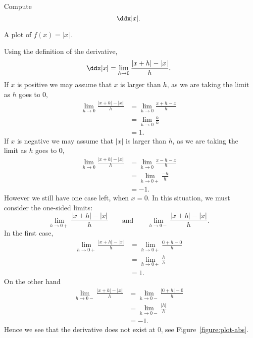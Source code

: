 \begin{example}
Compute 
\[
\ddx |x|.
\]
\end{example}
\begin{marginfigure}
\caption{A plot of $f(x) = |x|$.}
\label{figure:plot-abs}
\end{marginfigure}
\begin{solution}
Using the definition of the derivative,
\[
\ddx |x| = \lim_{h\to0}\frac{|x+h| -|x|}{h}.
\]
If $x$ is positive we may assume that $x$ is larger than $h$, as we are
taking the limit as $h$ goes to $0$,
\begin{align*}
\lim_{h\to0}\frac{|x+h| -|x|}{h} &= \lim_{h\to0}\frac{x+h -x}{h}\\
&= \lim_{h\to0}\frac{h}{h}\\
&= 1.
\end{align*}
If $x$ is negative we may assume that $|x|$ is larger than $h$, as we are taking
the limit as $h$ goes to $0$,
\begin{align*}
\lim_{h\to0}\frac{|x+h| -|x|}{h} &= \lim_{h\to0}\frac{x-h -x}{h}\\
&= \lim_{h\to0+}\frac{-h}{h}\\
&= -1.
\end{align*}
However we still have one case left, when $x=0$. In this situation, we
must consider the one-sided limits:
\[
\lim_{h\to0+}\frac{|x+h| -|x|}{h}\qquad\text{and}\qquad \lim_{h\to0-}\frac{|x+h| -|x|}{h}.
\]
In the first case, 
\begin{align*}
\lim_{h\to0+}\frac{|x+h| -|x|}{h} &= \lim_{h\to 0+}\frac{0+h - 0}{h}\\
&= \lim_{h\to 0+}\frac{h}{h}\\
&=1.
\end{align*}
On the other hand
\begin{align*}
\lim_{h\to0-}\frac{|x+h| -|x|}{h} &= \lim_{h\to 0-}\frac{|0+h| - 0}{h}\\
&= \lim_{h\to 0-}\frac{|h|}{h}\\
&=-1.
\end{align*}
Hence we see that the derivative does not exist at $0$, see Figure~\ref{figure:plot-abs}. 
\end{solution}






